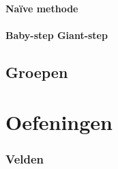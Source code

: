 \documentclass[12pt]{report}
\begin{document}
\subsection{Naïve methode}

\subsection{Baby-step Giant-step}
\chapter{Groepen}
\label{ch:groepen}


\part{Oefeningen}
\section{Velden}
\end{document}
